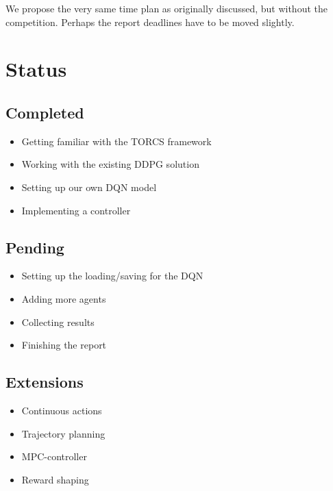 \documentclass{article}
\begin{document}
We propose the very same time plan as originally discussed, but without the competition. Perhaps the report deadlines have to be moved slightly.

\section{Status}

\subsection{Completed}

\begin{itemize}
	\item Getting familiar with the TORCS framework
	\item Working with the existing DDPG solution
	\item Setting up our own DQN model
	\item Implementing a controller
\end{itemize}

\subsection{Pending}

\begin{itemize}
	\item Setting up the loading/saving for the DQN
	\item Adding more agents
	\item Collecting results
	\item Finishing the report
\end{itemize}

\subsection{Extensions}

\begin{itemize}
	\item Continuous actions
	\item Trajectory planning
	\item MPC-controller
	\item Reward shaping
	
\end{itemize}
\end{document}
